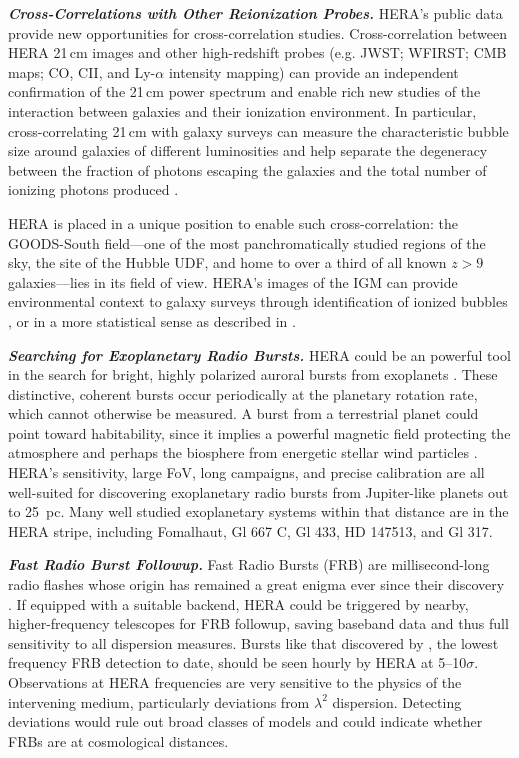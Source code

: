 \documentclass[preprint,11pt]{aastex}
\begin{document}
\emph{\textbf{Cross-Correlations with Other Reionization Probes.}}
\label{sec:crossCorr}
HERA's public data provide new opportunities for cross-correlation studies.
Cross-correlation between HERA 21\,cm images and other high-redshift probes
(e.g. JWST; WFIRST; CMB maps; CO, CII, and Ly-$\alpha$ intensity mapping) 
can provide an independent confirmation of the 21\,cm power spectrum
\citep[i.e.][]{lidz_et_al2009,dore_et_al2014,silva_et_al2015,vrbanec2016} and enable rich new studies of
the interaction between galaxies and their ionization environment. 
In particular, cross-correlating 21\,cm with galaxy surveys can measure the characteristic bubble size around galaxies of
different luminosities \citep{lidz_et_al2009} and help separate the degeneracy
between the fraction of photons escaping the galaxies and the
total number of ionizing photons produced \citep{zackrisson2013}.

HERA is placed in a unique position to enable such cross-correlation: the GOODS-South field---one of the most panchromatically studied regions of the sky, the site of the Hubble UDF, and home to over a third of all known $z>9$
galaxies---lies in its field of view. HERA's images of the IGM can provide environmental context to galaxy surveys through identification of
ionized bubbles \citep{malloy_lidz2013}, or in a more statistical sense as
described in \cite{beardsley_et_al2015}. 


\textbf{\emph{Searching for Exoplanetary Radio Bursts.}}
\label{sec:exoplanets}
HERA could be an powerful tool in the search for bright, highly polarized auroral bursts
from exoplanets %
\citep{treumann2006,hallinan_et_al2015}. These
distinctive, coherent bursts occur periodically at the planetary
rotation rate, which cannot otherwise be measured. 
A burst from a terrestrial planet could point toward
habitability, since it implies a powerful magnetic field
protecting the atmosphere and perhaps the biosphere from energetic stellar wind
particles \citep{tarter_et_al2007}. HERA's sensitivity, large FoV, long campaigns, and precise calibration are all well-suited
for discovering exoplanetary radio bursts from Jupiter-like planets out to 25~pc. Many well studied exoplanetary systems within that distance are in the HERA stripe, including Fomalhaut, Gl 667 C, Gl 433, HD 147513, and Gl 317.


\textbf{\emph{Fast Radio Burst Followup.}}
\label{sec:FRBs}
Fast Radio Bursts (FRB) are millisecond-long radio flashes whose origin has remained a great enigma ever since their discovery \citep{2007Sci...318..777L}. 
If equipped with a suitable backend, HERA could be triggered by nearby, higher-frequency telescopes for FRB followup, saving baseband data and thus full sensitivity to all dispersion measures.
Bursts like that discovered by \citet{masui_et_al2015}, the lowest frequency
FRB detection to date, should be seen hourly by HERA at 5--10$\sigma$. %
 Observations at HERA frequencies are very sensitive to the physics of
the intervening medium, particularly deviations from $\lambda^2$
dispersion. Detecting deviations would rule out broad classes of models and could indicate whether FRBs are at cosmological distances.
\end{document}
